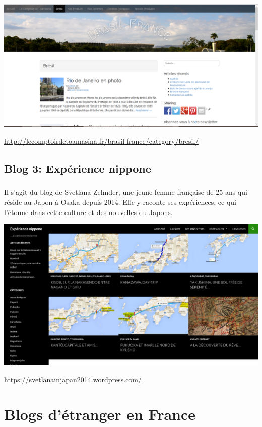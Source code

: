 \begin{center}
	\includegraphics[scale=0.25]{Toamasina.png}
\end{center}
\url{http://lecomptoirdetoamasina.fr/brasil-france/category/bresil/}

\section{Blog 3: Expérience nippone}

\paragraph{} Il s'agit du blog de Svetlana Zehnder, une jeune femme française
de 25 ans qui réside au Japon à Osaka depuis 2014. Elle y raconte ses
expériences, ce qui l'étonne dans cette culture et des nouvelles du Japons.

\begin{center}
	\includegraphics[scale=0.25]{Svetlana.png}
\end{center}
\url{https://svetlanainjapan2014.wordpress.com/}

\chapter{Blogs d'étranger en France}

